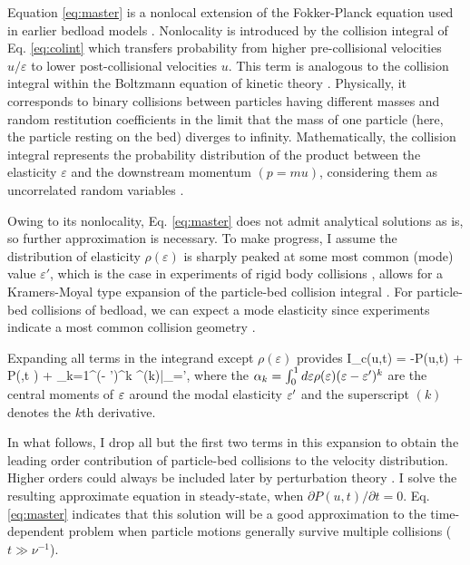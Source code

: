 Equation \ref{eq:master} is a nonlocal extension of the Fokker-Planck equation used in earlier bedload models \citep{Fan2014,Ancey2014}. 
Nonlocality is introduced by the collision integral of Eq. \ref{eq:colint} which transfers probability from higher pre-collisional velocities $u/\varepsilon$ to lower post-collisional velocities $u$.
This term is analogous to the collision integral within the Boltzmann equation of kinetic theory \citep{Duderstadt1979, Brilliantov2004}. Physically, it corresponds to binary collisions between particles having different masses and random restitution coefficients \citep[cf.][]{Serero2015} in the limit that the mass of one particle (here, the particle resting on the bed) diverges to infinity.
Mathematically, the collision integral represents the probability distribution of the product between the elasticity $\varepsilon$ and the downstream momentum $(p = m u)$, considering them as uncorrelated random variables \citep[cf.][]{Feller1968}.


Owing to its nonlocality, Eq. \ref{eq:master} does not admit analytical solutions as is, so further approximation is necessary.
To make progress, I assume the distribution of elasticity $\rho(\varepsilon)$ is sharply peaked at some most common (mode) value $\varepsilon'$, which is the case in experiments of rigid body collisions \citep{Glielmo2014}, allows for a Kramers-Moyal type expansion of the particle-bed collision integral \citep{Gardiner1983}.
For particle-bed collisions of bedload, we can expect a mode elasticity since experiments indicate a most common collision geometry \citep[e.g.][]{Gordon1972,Martin2013}.

Expanding all terms in the integrand except $\rho(\varepsilon)$ provides
\be I_c(u,t) = -P(u,t) + P\big(,t \big) + \sum_{k=1}^\infty {}(\ve - \ve')^k ^{(k)}\Big|_{\ve=\ve'},\label{eq:expansion}\ee
where the $\alpha_k = \int_0^1 d\varepsilon \rho(\varepsilon) (\varepsilon-\varepsilon')^k $ are the central moments of $\varepsilon$ around the modal elasticity $\varepsilon'$ and the superscript $(k)$ denotes the $k$th derivative.

In what follows, I drop all but the first two terms in this expansion to obtain the leading order contribution of particle-bed collisions to the velocity distribution.
Higher orders could always be included later by perturbation theory \citep{Morse1953a}.
I solve the resulting approximate equation in steady-state, when $\partial P(u,t)/\partial t = 0$. Eq. \ref{eq:master} indicates that this solution will be a good approximation to the time-dependent problem when particle motions generally survive multiple collisions ($t\gg \nu^{-1}$).

